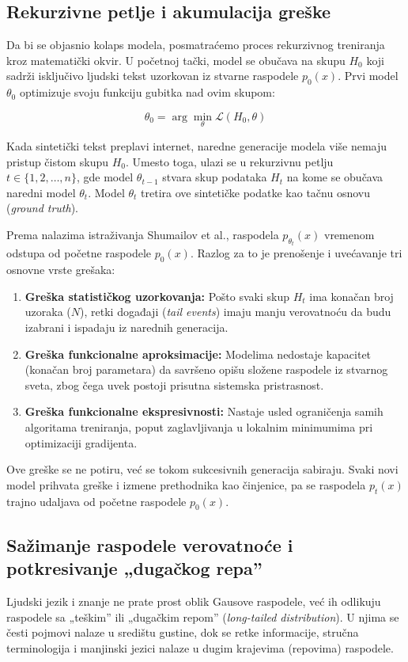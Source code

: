 \documentclass[12pt]{article}
\begin{document}
	\subsection{Rekurzivne petlje i akumulacija greške}
	Da bi se objasnio kolaps modela, posmatraćemo proces rekurzivnog treniranja kroz matematički okvir. U početnoj tački, model se obučava na skupu $H_0$ koji sadrži isključivo ljudski tekst uzorkovan iz stvarne raspodele $p_0(x)$. Prvi model $\theta_0$ optimizuje svoju funkciju gubitka nad ovim skupom:
	
	$$\theta_0 = \arg\min_{\theta} \mathcal{L}(H_0, \theta)$$
	
	Kada sintetički tekst preplavi internet, naredne generacije modela više nemaju pristup čistom skupu $H_0$. Umesto toga, ulazi se u rekurzivnu petlju $t \in \{1, 2, \dots, n\}$, gde model $\theta_{t-1}$ stvara skup podataka $H_t$ na kome se obučava naredni model $\theta_t$. Model $\theta_t$ tretira ove sintetičke podatke kao tačnu osnovu (\textit{ground truth}).
	
	Prema nalazima istraživanja Shumailov et al., raspodela $p_{\theta_t}(x)$ vremenom odstupa od početne raspodele $p_0(x)$. Razlog za to je prenošenje i uvećavanje tri osnovne vrste grešaka:
	
	\begin{enumerate}
		\item \textbf{Greška statističkog uzorkovanja:} Pošto svaki skup $H_t$ ima konačan broj uzoraka ($N$), retki događaji (\textit{tail events}) imaju manju verovatnoću da budu izabrani i ispadaju iz narednih generacija.
		\item \textbf{Greška funkcionalne aproksimacije:} Modelima nedostaje kapacitet (konačan broj parametara) da savršeno opišu složene raspodele iz stvarnog sveta, zbog čega uvek postoji prisutna sistemska pristrasnost.
		\item \textbf{Greška funkcionalne ekspresivnosti:} Nastaje usled ograničenja samih algoritama treniranja, poput zaglavljivanja u lokalnim minimumima pri optimizaciji gradijenta.
	\end{enumerate}
	
	Ove greške se ne potiru, već se tokom sukcesivnih generacija sabiraju. Svaki novi model prihvata greške i izmene prethodnika kao činjenice, pa se raspodela $p_t(x)$ trajno udaljava od početne raspodele $p_0(x)$.
	
	\subsection{Sažimanje raspodele verovatnoće i potkresivanje „dugačkog repa”}
	Ljudski jezik i znanje ne prate prost oblik Gausove raspodele, već ih odlikuju raspodele sa „teškim” ili „dugačkim repom” (\textit{long-tailed distribution}). U njima se česti pojmovi nalaze u središtu gustine, dok se retke informacije, stručna terminologija i manjinski jezici nalaze u dugim krajevima (repovima) raspodele.
	
\end{document}
